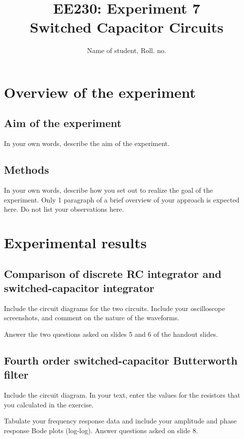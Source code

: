 \documentclass[12pt]{article}
\title{EE230: Experiment 7\\
Switched Capacitor Circuits}
\author{Name of student, Roll. no.}
\begin{document}
\maketitle

\section{Overview of the experiment}

\subsection{Aim of the experiment}

In your own words, describe the aim of the experiment.

\subsection{Methods}

In your own words, describe how you set out to realize the goal of the experiment. Only 1 paragraph of a brief overview of your approach is expected here. Do not list your observations here.

\section{Experimental results}

\subsection{Comparison of discrete RC integrator and switched-capacitor integrator}

Include the circuit diagrams for the two circuits.
Include your oscilloscope screenshots, and comment on the nature of the waveforms.

Answer the two questions asked on slides 5 and 6 of the handout slides.

\subsection{Fourth order switched-capacitor Butterworth filter}

Include the circuit diagram. In your text, enter the values for the resistors that you calculated in the exercise.

Tabulate your frequency response data and include your amplitude and phase response Bode plots (log-log). Answer questions asked on slide 8.
\end{document}
